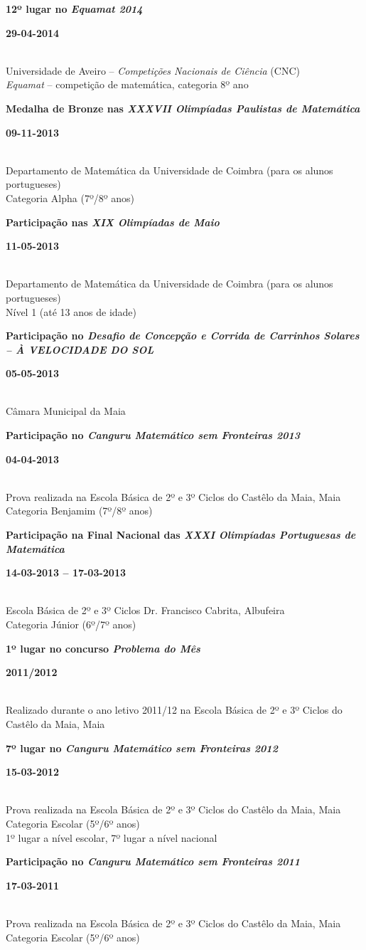 \documentclass[8pt]{extarticle}
\newcommand{\parag}[1]{
\begin{minipage}{\textwidth} \hfill
\begin{minipage}{\dimexpr\textwidth-0.6cm}
	#1
\end{minipage}
\end{minipage}
}
\newcommand{\itemtime}[2]{
#1 \hfill \begin{minipage}[t]{0.185\textwidth}         #2  \end{minipage}
}
\newcommand{\job}[3]{\parag{
\itemtime{\textbf{#1}}{\textbf{#2}}\\
#3 \vspace*{9px}}}
\begin{document}
\job{12º lugar no \textit{Equamat 2014}}{29-04-2014}{
Universidade de Aveiro – \textit{Competições Nacionais de Ciência} (CNC) \\
\textit{Equamat} – competição de matemática, categoria 8º ano
}
\job{Medalha de Bronze nas \textit{XXXVII Olimpíadas Paulistas de Matemática}}{09-11-2013}{
Departamento de Matemática da Universidade de Coimbra (para os alunos portugueses)\\
Categoria Alpha (7º/8º anos)
}
\job{Participação nas \textit{XIX Olimpíadas de Maio}}{11-05-2013}{
Departamento de Matemática da Universidade de Coimbra (para os alunos portugueses)\\
Nível 1 (até 13 anos de idade)
}
\job{Participação no \textit{Desafio de Concepção e Corrida de Carrinhos Solares – À VELOCIDADE DO SOL}}{05-05-2013}{
Câmara Municipal da Maia
}
\job{Participação no \textit{Canguru Matemático sem Fronteiras 2013}}{04-04-2013}{
Prova realizada na Escola Básica de 2º e 3º Ciclos do Castêlo da Maia, Maia\\
Categoria Benjamim (7º/8º anos)
}
\job{Participação na Final Nacional das \textit{XXXI Olimpíadas Portuguesas de Matemática}}{14-03-2013 – 17-03-2013}{
Escola Básica de 2º e 3º Ciclos Dr. Francisco Cabrita, Albufeira\\
Categoria Júnior (6º/7º anos)
}
\job{1º lugar no concurso \textit{Problema do Mês}}{2011/2012}{
Realizado durante o ano letivo 2011/12 na Escola Básica de 2º e 3º Ciclos do Castêlo da Maia, Maia
}
\job{7º lugar no \textit{Canguru Matemático sem Fronteiras 2012}}{15-03-2012}{
Prova realizada na Escola Básica de 2º e 3º Ciclos do Castêlo da Maia, Maia\\
Categoria Escolar (5º/6º anos)\\
1º lugar a nível escolar, 7º lugar a nível nacional
}
\job{Participação no \textit{Canguru Matemático sem Fronteiras 2011}}{17-03-2011}{
Prova realizada na Escola Básica de 2º e 3º Ciclos do Castêlo da Maia, Maia\\
Categoria Escolar (5º/6º anos)
}
\end{document}
